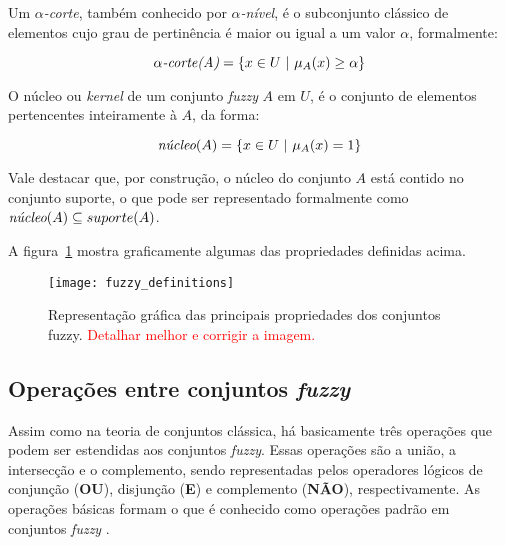 \begin{defn}
Um $\alpha$\emph{-corte}, também conhecido por $\alpha$\emph{-nível}, é o subconjunto clássico de elementos cujo grau de pertinência é maior ou igual a um valor $\alpha$, formalmente:

\begin{equation}
  \alpha\emph{-corte(A)} = \{x \in U \ |\ \mu_A(x) \geq \alpha \}
\label{equ:conjunto_fuzzy_alpha_corte}
\end{equation}
\end{defn}

\begin{defn}
O núcleo ou \emph{kernel} de um conjunto \emph{fuzzy} $A$ em $U$, é o conjunto de elementos pertencentes inteiramente à $A$, da forma:

\begin{equation}
  \emph{núcleo}(A) = \{x \in U \ |\ \mu_A(x) = 1 \}
\label{equ:conjunto_fuzzy_kernel}
\end{equation}
\end{defn}

Vale destacar que, por construção, o núcleo do conjunto $A$ está contido no conjunto suporte, o que pode ser representado formalmente como $\emph{núcleo}(A) \subseteq suporte(A)$.

A figura~\ref{fig:fuzzy_definitions} mostra graficamente algumas das propriedades definidas acima.

\begin{figure}[!h]
  \centering
  \texttt{[image: fuzzy\_definitions]}
  \caption{Representação gráfica das principais propriedades dos conjuntos fuzzy. \textcolor{red}{Detalhar melhor e corrigir a imagem.}}
  \label{fig:fuzzy_definitions} 
\end{figure}

\subsection{Operações entre conjuntos \emph{fuzzy}}
\label{sec:operacoes_conjuntos_fuzzy}

Assim como na teoria de conjuntos clássica, há basicamente três operações que podem ser estendidas aos conjuntos \emph{fuzzy}. Essas operações são a união, a intersecção e o complemento, sendo representadas pelos operadores lógicos de conjunção (\textbf{OU}), disjunção (\textbf{E}) e complemento (\textbf{NÃO}), respectivamente. As operações básicas formam o que é conhecido como operações padrão em conjuntos \emph{fuzzy} \citep{klir:95}.

